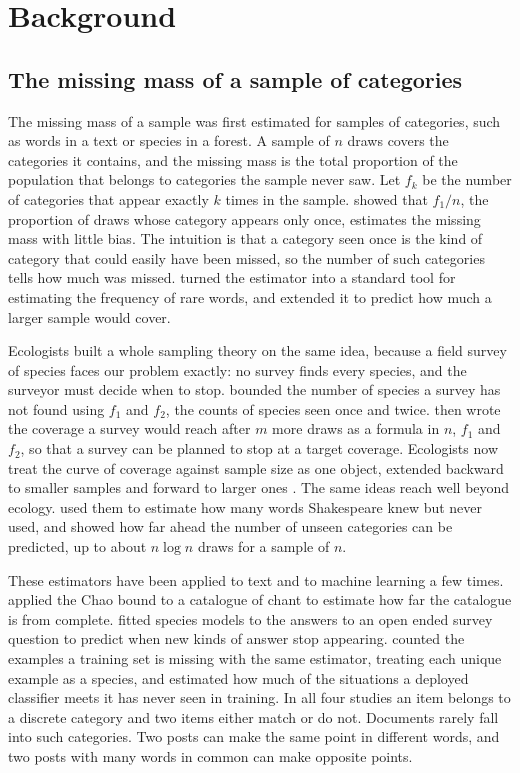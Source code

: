 \section{Background}

\subsection{The missing mass of a sample of categories}

The missing mass of a sample was first estimated for samples of categories, such as words in a text or species in a forest. A sample of $n$ draws covers the categories it contains, and the missing mass is the total proportion of the population that belongs to categories the sample never saw. Let $f_k$ be the number of categories that appear exactly $k$ times in the sample. \citet{good1953} showed that $f_1/n$, the proportion of draws whose category appears only once, estimates the missing mass with little bias. The intuition is that a category seen once is the kind of category that could easily have been missed, so the number of such categories tells how much was missed. \citet{gale1995} turned the estimator into a standard tool for estimating the frequency of rare words, and \citet{good1956} extended it to predict how much a larger sample would cover.

Ecologists built a whole sampling theory on the same idea, because a field survey of species faces our problem exactly: no survey finds every species, and the surveyor must decide when to stop. \citet{chao1984} bounded the number of species a survey has not found using $f_1$ and $f_2$, the counts of species seen once and twice. \citet{chao2012coverage} then wrote the coverage a survey would reach after $m$ more draws as a formula in $n$, $f_1$ and $f_2$, so that a survey can be planned to stop at a target coverage. Ecologists now treat the curve of coverage against sample size as one object, extended backward to smaller samples and forward to larger ones \citep{colwell2012,chao2014hill}. The same ideas reach well beyond ecology. \citet{efron1976} used them to estimate how many words Shakespeare knew but never used, and \citet{orlitsky2016unseen} showed how far ahead the number of unseen categories can be predicted, up to about $n \log n$ draws for a sample of $n$.

These estimators have been applied to text and to machine learning a few times. \citet{hajic2025} applied the Chao bound to a catalogue of chant to estimate how far the catalogue is from complete. \citet{tran2017} fitted species models to the answers to an open ended survey question to predict when new kinds of answer stop appearing. \citet{chung2018unknown} counted the examples a training set is missing with the same estimator, treating each unique example as a species, and \citet{pal2026blindspot} estimated how much of the situations a deployed classifier meets it has never seen in training. In all four studies an item belongs to a discrete category and two items either match or do not. Documents rarely fall into such categories. Two posts can make the same point in different words, and two posts with many words in common can make opposite points.

